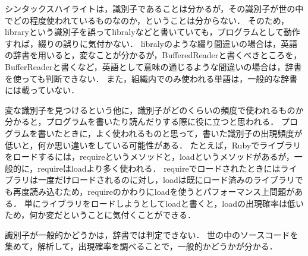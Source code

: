   シンタックスハイライトは，識別子であることは分かるが，その識別子が世の中でどの程度使われているものなのか，ということは分からない．
  そのため，libraryという識別子を誤ってlibralyなどと書いていても，プログラムとして動作すれば，綴りの誤りに気付かない．
  libralyのような綴り間違いの場合は，英語の辞書を用いると，変なことが分かるが，BufferedReaderと書くべきところを，BufferReaderと書くなど，英語として意味の通じるような間違いの場合は，辞書を使っても判断できない．
  また，組織内でのみ使われる単語は，一般的な辞書には載っていない．

  変な識別子を見つけるという他に，識別子がどのくらいの頻度で使われるものか分かると，プログラムを書いたり読んだりする際に役に立つと思われる．
  プログラムを書いたときに，よく使われるものと思って，書いた識別子の出現頻度が低いと，何か思い違いをしている可能性がある．
  たとえば，Rubyでライブラリをロードするには，requireというメソッドと，loadというメソッドがあるが，一般的に，requireはloadより多く使われる．
  requireでロードされたときにはライブラリは一度だけロードされるのに対し，loadは既にロード済みのライブラリでも再度読み込むため，requireのかわりにloadを使うとパフォーマンス上問題がある．
  単にライブラリをロードしようとしてloadと書くと，loadの出現確率は低いため，何か変だということに気付くことができる．

  識別子が一般的かどうかは，辞書では判定できない．
  世の中のソースコードを集めて，解析して，出現確率を調べることで，一般的かどうかが分かる．
